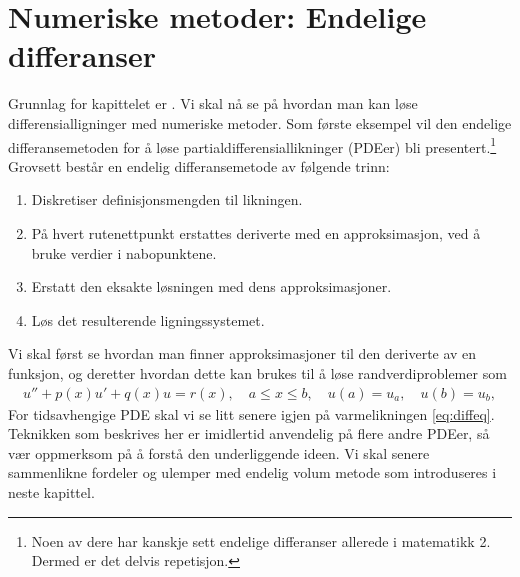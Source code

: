 \section{Numeriske metoder: Endelige differanser}

Grunnlag for kapittelet er \cite{KaM20}.
Vi skal nå se på hvordan man kan løse differensialligninger med numeriske metoder. Som første eksempel vil den endelige differansemetoden for å løse partialdifferensiallikninger (PDEer) bli presentert.\footnote{Noen av dere har kanskje sett endelige differanser allerede i matematikk 2. Dermed er det delvis repetisjon.}
Grovsett består en endelig differansemetode av følgende trinn:
\begin{enumerate}
    \item Diskretiser definisjonsmengden til likningen.
    \item På hvert rutenettpunkt erstattes deriverte med en approksimasjon, ved å bruke verdier i nabopunktene.
    \item Erstatt den eksakte løsningen med dens approksimasjoner.
    \item Løs det resulterende ligningssystemet.
\end{enumerate}
Vi skal først se hvordan man finner approksimasjoner til den deriverte av en funksjon, og deretter hvordan dette kan brukes til å løse randverdiproblemer som
\begin{align}\label{2P-RVP}
u'' + p(x)u' + q(x)u = r(x), \quad a \leq x \leq b, \quad u(a) = u_a, \quad u(b) = u_b,
\end{align}
For tidsavhengige PDE skal vi se litt senere igjen på varmelikningen \eqref{eq:diffeq}. Teknikken som beskrives her er imidlertid anvendelig på flere andre PDEer, så vær oppmerksom på å forstå den underliggende ideen. Vi skal senere sammenlikne fordeler og ulemper med endelig volum metode som introduseres i neste kapittel.


